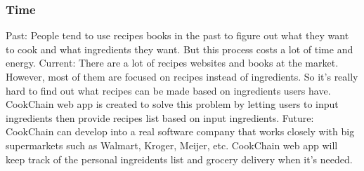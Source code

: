 \documentclass{article}
\begin{document}
\subsubsection{Time}
Past:\newline
People tend to use recipes books in the past to figure out what they want to cook and what ingredients they want. But this process costs a lot of time and energy.\newline
Current:\newline
There are a lot of recipes websites and books at the market. However, most of them are focused on recipes instead of ingredients. So it's really hard to find out what recipes can be made based on ingredients users have. CookChain web app is created to solve this problem by letting users to input ingredients then provide recipes list based on input ingredients.\newline
Future:\newline
CookChain can develop into a real software company that works closely with big supermarkets such as Walmart, Kroger, Meijer, etc. CookChain web app will keep track of the personal ingreidents list and grocery delivery when it's needed.
\clearpage
\end{document}
